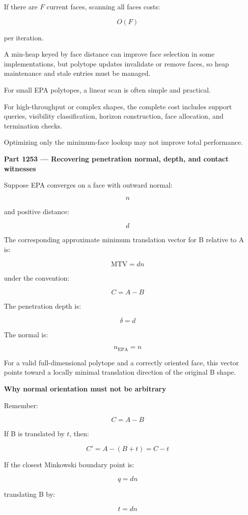 If there are \(F\) current faces, scanning all faces costs:

\[
O(F)
\]

per iteration.

A min-heap keyed by face distance can improve face selection in some implementations, but polytope updates invalidate or remove faces, so heap maintenance and stale entries must be managed.

For small EPA polytopes, a linear scan is often simple and practical.

For high-throughput or complex shapes, the complete cost includes support queries, visibility classification, horizon construction, face allocation, and termination checks.

Optimizing only the minimum-face lookup may not improve total performance.

\textbf{Part 1253 --- Recovering penetration normal, depth, and contact witnesses}

Suppose EPA converges on a face with outward normal:

\[
n
\]

and positive distance:

\[
d
\]

The corresponding approximate minimum translation vector for B relative to A is:

\[
\boxed{ \mathrm{MTV}=dn }
\]

under the convention:

\[
C=A-B
\]

The penetration depth is:

\[
\boxed{\delta=d}
\]

The normal is:

\[
\boxed{n_{\mathrm{EPA}}=n}
\]

For a valid full-dimensional polytope and a correctly oriented face, this vector points toward a locally minimal translation direction of the original B shape.

\textbf{Why normal orientation must not be arbitrary}

Remember:

\[
C=A-B
\]

If B is translated by \(t\), then:

\[
C'=A-(B+t)=C-t
\]

If the closest Minkowski boundary point is:

\[
q=dn
\]

translating B by:

\[
t=dn
\]

